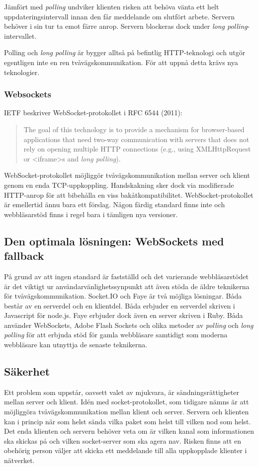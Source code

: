 Jämfört med \emph{polling} undviker klienten risken att behöva vänta ett helt uppdateringsintervall innan den får meddelande om slutfört arbete. Servern behöver i sin tur ta emot färre anrop. Servern blockeras dock under \emph{long polling}-intervallet.

Polling och \emph{long polling} är bygger alltså på befintlig HTTP-teknologi och utgör egentligen inte en ren tvåvägskommunikation. För att uppnå detta krävs nya teknologier.

\subsubsection{Websockets}
IETF beskriver WebSocket-protokollet i RFC 6544 (2011):

\begin{quote}
The goal of this technology is to provide a mechanism for browser-based applications that need two-way communication with servers that does not rely on opening multiple HTTP connections (e.g., using XMLHttpRequest or <iframe>s and \emph{long polling}).
\end{quote}

WebSocket-protokollet möjliggör tvåvägskommunikation mellan server och klient genom en enda TCP-uppkoppling. Handskakning sker dock via modifierade HTTP-anrop för att bibehålla en viss bakåtkompatibilitet.
WebSocket-protokollet är emellertid ännu bara ett förslag. Någon färdig standard finns inte och webbläsarstöd finns i regel bara i tämligen nya versioner.

\subsection{Den optimala lösningen: WebSockets med fallback}
På grund av att ingen standard är fastställd och det varierande webbläsarstödet är det viktigt ur användarvänlighetssynpunkt att även stöda de äldre teknikerna för tvåvägskommunikation.
Socket.IO och Faye är två möjliga lösningar. Båda består av en serverdel och en klientdel. Båda erbjuder en serverdel skriven i Javascript för node.js. Faye erbjuder dock även en server skriven i Ruby.
Båda använder WebSockets, Adobe Flash Sockets och olika metoder av \emph{polling} och \emph{long polling} för att erbjuda stöd för gamla webbläsare samtidigt som moderna webbläsare kan utnyttja de senaste teknikerna.

\subsection{Säkerhet}
Ett problem som uppstår, oavsett valet av mjukvara, är sändningsrättigheter mellan server och klient. Idén med socket-protokollet, som tidigare nämns är att möjliggöra tvåvägskommunikation mellan klient och server. Servern och klienten kan i princip när som helst sända vilka paket som helst till vilken nod som helst. Det enda klienten och servern behöver veta om är vilken kanal som informationen ska skickas på och vilken socket-server som ska agera nav. Risken finns att en obehörig person väljer att skicka ett meddelande till alla uppkopplade klienter i nätverket.

